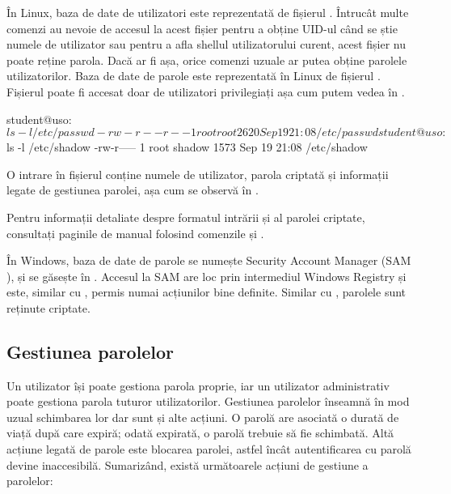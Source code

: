 În Linux, baza de date de utilizatori este reprezentată de fișierul .
Întrucât multe comenzi au nevoie de accesul la acest fișier pentru a obține
UID-ul când se știe numele de utilizator sau pentru a afla shellul
utilizatorului curent, acest fișier nu poate reține parola. Dacă ar fi așa,
orice comenzi uzuale ar putea obține parolele utilizatorilor. Baza de date de
parole este reprezentată în Linux de fișierul . Fișierul 
poate fi accesat doar de utilizatori privilegiați așa cum putem vedea în .

\begin{screen}[caption={Permisiuni de acces pe fișierele de parole},label={lst:user:shadow-perm}]
student@uso:~$ ls -l /etc/passwd
-rw-r--r-- 1 root root 2620 Sep 19 21:08 /etc/passwd
student@uso:~$ ls -l /etc/shadow
-rw-r----- 1 root shadow 1573 Sep 19 21:08 /etc/shadow
\end{screen}

O intrare în fișierul  conține numele de utilizator, parola criptată
și informații legate de gestiunea parolei, așa cum se observă în .


Pentru informații detaliate despre formatul intrării și al parolei criptate,
consultați paginile de manual folosind comenzile  și .

În Windows, baza de date de parole se numește Security Account Manager (SAM
), și se găsește în
. Accesul la SAM are loc prin intermediul
Windows Registry și este, similar cu , permis numai acțiunilor bine
definite. Similar cu , parolele sunt reținute criptate.

\subsection{Gestiunea parolelor}
\label{sec:user:manage-passwords}

Un utilizator își poate gestiona parola proprie, iar un utilizator administrativ
poate gestiona parola tuturor utilizatorilor. Gestiunea parolelor înseamnă în
mod uzual schimbarea lor dar sunt și alte acțiuni. O parolă are asociată o
durată de viață după care expiră; odată expirată, o parolă trebuie să fie
schimbată. Altă acțiune legată de parole este blocarea parolei, astfel încât
autentificarea cu parolă devine inaccesibilă. Sumarizând, există următoarele
acțiuni de gestiune a parolelor:

